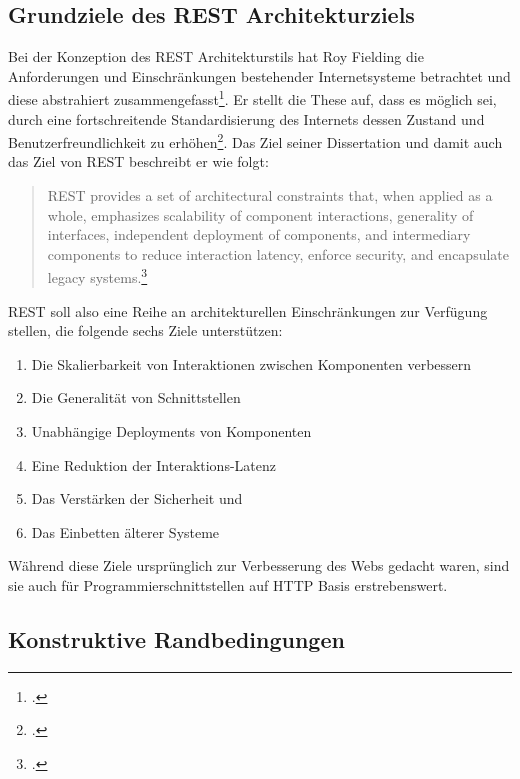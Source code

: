 \subsection{Grundziele des REST Architekturziels}\label{subsection:grundziele-des-rest}

Bei der Konzeption des REST Architekturstils hat Roy Fielding die Anforderungen und Einschränkungen bestehender Internetsysteme betrachtet und diese abstrahiert zusammengefasst\footcite[Vgl. ][S. 76]{fielding_architectural_2000}. Er stellt die These auf, dass es möglich sei, durch eine fortschreitende Standardisierung des Internets dessen Zustand und Benutzerfreundlichkeit zu erhöhen\footcite[Vgl. ][S. 73f]{fielding_architectural_2000}. Das Ziel seiner Dissertation und damit auch das Ziel von REST beschreibt er wie folgt:

\begin{quote}
    REST provides a set of architectural constraints that, when applied as a whole, emphasizes scalability of component interactions, generality of interfaces, independent deployment of components, and intermediary components to reduce interaction latency, enforce security, and encapsulate legacy systems.\footcite[Vgl. ][S. 75]{fielding_architectural_2000}
\end{quote}

REST soll also eine Reihe an architekturellen Einschränkungen zur Verfügung stellen, die folgende sechs Ziele unterstützen:

\begin{enumerate}
    \item Die Skalierbarkeit von Interaktionen zwischen Komponenten verbessern
    \item Die Generalität von Schnittstellen
    \item Unabhängige Deployments von Komponenten
    \item Eine Reduktion der Interaktions-Latenz
    \item Das Verstärken der Sicherheit und
    \item Das Einbetten älterer Systeme
\end{enumerate}

Während diese Ziele ursprünglich zur Verbesserung des Webs gedacht waren, sind sie auch für Programmierschnittstellen auf HTTP Basis erstrebenswert.

\subsection{Konstruktive Randbedingungen}\label{subsection:konstruktive-randbedingungen}

